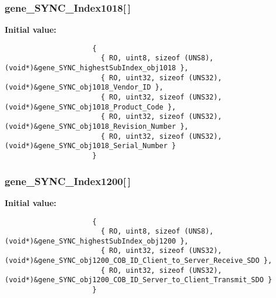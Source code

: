 \subsubsection{ {\bf gene\_\-SYNC\_\-Index1018}[$\,$]}\label{objdict_8c_12b2f0230e7348678b706126e3661a97}


\textbf{Initial value:}

\begin{Code}\begin{verbatim} 
                     {
                       { RO, uint8, sizeof (UNS8), (void*)&gene_SYNC_highestSubIndex_obj1018 },
                       { RO, uint32, sizeof (UNS32), (void*)&gene_SYNC_obj1018_Vendor_ID },
                       { RO, uint32, sizeof (UNS32), (void*)&gene_SYNC_obj1018_Product_Code },
                       { RO, uint32, sizeof (UNS32), (void*)&gene_SYNC_obj1018_Revision_Number },
                       { RO, uint32, sizeof (UNS32), (void*)&gene_SYNC_obj1018_Serial_Number }
                     }
\end{verbatim}\end{Code}
\subsubsection{ {\bf gene\_\-SYNC\_\-Index1200}[$\,$]}\label{objdict_8c_10ee2c6e3fc72843f0a40a78a2169f8a}


\textbf{Initial value:}

\begin{Code}\begin{verbatim} 
                     {
                       { RO, uint8, sizeof (UNS8), (void*)&gene_SYNC_highestSubIndex_obj1200 },
                       { RO, uint32, sizeof (UNS32), (void*)&gene_SYNC_obj1200_COB_ID_Client_to_Server_Receive_SDO },
                       { RO, uint32, sizeof (UNS32), (void*)&gene_SYNC_obj1200_COB_ID_Server_to_Client_Transmit_SDO }
                     }
\end{verbatim}\end{Code}
